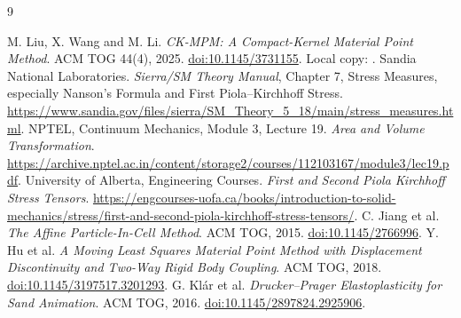 \documentclass[11pt,a4paper]{article}
\newcommand{\code}[1]{\texttt{\detokenize{#1}}}
\numberwithin{equation}{section}
\begin{document}
\begin{thebibliography}{9}
\raggedright
{} M. Liu, X. Wang and M. Li.
\emph{CK-MPM: A Compact-Kernel Material Point Method}. ACM TOG 44(4), 2025.
\href{https://doi.org/10.1145/3731155}{doi:10.1145/3731155}.
Local copy: \code{../../../CK-MPM Paper.pdf}.
 Sandia National Laboratories.
\emph{Sierra/SM Theory Manual}, Chapter 7, Stress Measures, especially
Nanson's Formula and First Piola--Kirchhoff Stress.
\url{https://www.sandia.gov/files/sierra/SM_Theory_5_18/main/stress_measures.html}.
 NPTEL, Continuum Mechanics, Module 3, Lecture 19.
\emph{Area and Volume Transformation}.
\url{https://archive.nptel.ac.in/content/storage2/courses/112103167/module3/lec19.pdf}.
 University of Alberta, Engineering Courses.
\emph{First and Second Piola Kirchhoff Stress Tensors}.
\url{https://engcourses-uofa.ca/books/introduction-to-solid-mechanics/stress/first-and-second-piola-kirchhoff-stress-tensors/}.
 C. Jiang et al.
\emph{The Affine Particle-In-Cell Method}. ACM TOG, 2015.
\href{https://doi.org/10.1145/2766996}{doi:10.1145/2766996}.
 Y. Hu et al.
\emph{A Moving Least Squares Material Point Method with Displacement
Discontinuity and Two-Way Rigid Body Coupling}. ACM TOG, 2018.
\href{https://doi.org/10.1145/3197517.3201293}{doi:10.1145/3197517.3201293}.
 G. Kl\'ar et al.
\emph{Drucker--Prager Elastoplasticity for Sand Animation}. ACM TOG, 2016.
\href{https://doi.org/10.1145/2897824.2925906}{doi:10.1145/2897824.2925906}.
\end{thebibliography}
\end{document}
